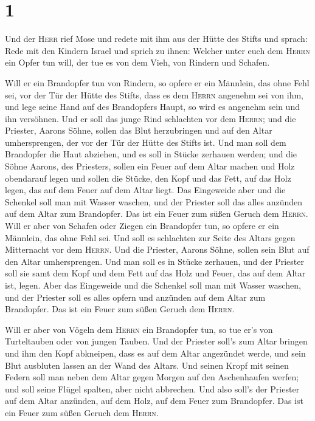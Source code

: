 \hypertarget{section}{%
\section{1}\label{section}}

 Und der \textsc{Herr} rief Mose und redete mit ihm aus
der Hütte des Stifts und sprach:  Rede mit den Kindern
Israel und sprich zu ihnen: Welcher unter euch dem \textsc{Herrn} ein
Opfer tun will, der tue es von dem Vieh, von Rindern und Schafen.

 Will er ein Brandopfer tun von Rindern, so opfere er ein
Männlein, das ohne Fehl sei, vor der Tür der Hütte des Stifts, dass es
dem \textsc{Herrn} angenehm sei von ihm,  und lege seine
Hand auf des Brandopfers Haupt, so wird es angenehm sein und ihn
versöhnen.  Und er soll das junge Rind schlachten vor dem
\textsc{Herrn}; und die Priester, Aarons Söhne, sollen das Blut
herzubringen und auf den Altar umhersprengen, der vor der Tür der Hütte
des Stifts ist.  Und man soll dem Brandopfer die Haut
abziehen, und es soll in Stücke zerhauen werden;  und die
Söhne Aarons, des Priesters, sollen ein Feuer auf dem Altar machen und
Holz obendarauf legen  und sollen die Stücke, den Kopf und
das Fett, auf das Holz legen, das auf dem Feuer auf dem Altar liegt.
 Das Eingeweide aber und die Schenkel soll man mit Wasser
waschen, und der Priester soll das alles anzünden auf dem Altar zum
Brandopfer. Das ist ein Feuer zum süßen Geruch dem \textsc{Herrn}.
 Will er aber von Schafen oder Ziegen ein Brandopfer tun,
so opfere er ein Männlein, das ohne Fehl sei.  Und soll
es schlachten zur Seite des Altars gegen Mitternacht vor dem
\textsc{Herrn}. Und die Priester, Aarons Söhne, sollen sein Blut auf den
Altar umhersprengen.  Und man soll es in Stücke zerhauen,
und der Priester soll sie samt dem Kopf und dem Fett auf das Holz und
Feuer, das auf dem Altar ist, legen.  Aber das Eingeweide
und die Schenkel soll man mit Wasser waschen, und der Priester soll es
alles opfern und anzünden auf dem Altar zum Brandopfer. Das ist ein
Feuer zum süßen Geruch dem \textsc{Herrn}.

 Will er aber von Vögeln dem \textsc{Herrn} ein
Brandopfer tun, so tue er's von Turteltauben oder von jungen Tauben.
 Und der Priester soll's zum Altar bringen und ihm den
Kopf abkneipen, dass es auf dem Altar angezündet werde, und sein Blut
ausbluten lassen an der Wand des Altars.  Und seinen
Kropf mit seinen Federn soll man neben dem Altar gegen Morgen auf den
Aschenhaufen werfen;  und soll seine Flügel spalten, aber
nicht abbrechen. Und also soll's der Priester auf dem Altar anzünden,
auf dem Holz, auf dem Feuer zum Brandopfer. Das ist ein Feuer zum süßen
Geruch dem \textsc{Herrn}.

